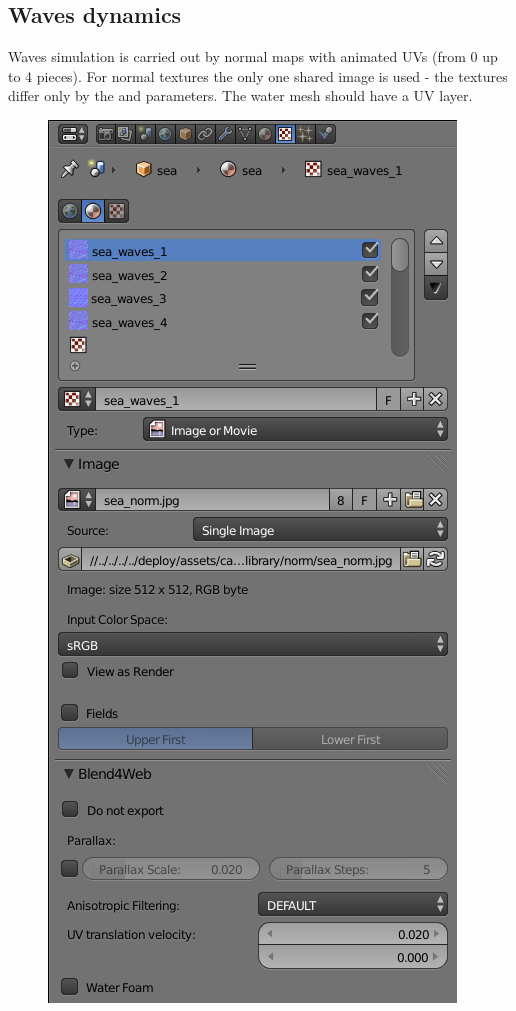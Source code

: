 \documentclass[a4paper,12pt,oneside]{sphinxmanual}
\begin{document}
\subsection{Waves dynamics}
\label{outdoor_rendering:id5}
Waves simulation is carried out by normal maps with animated UVs (from 0 up to 4 pieces). For normal textures the only one shared image is used - the textures differ only by the  and  parameters. The water mesh should have a UV layer.
\begin{figure}[htbp]
\centering

\includegraphics[width=0.700\linewidth]{water_texture_setup_normal.jpg}
\end{figure}
\end{document}
